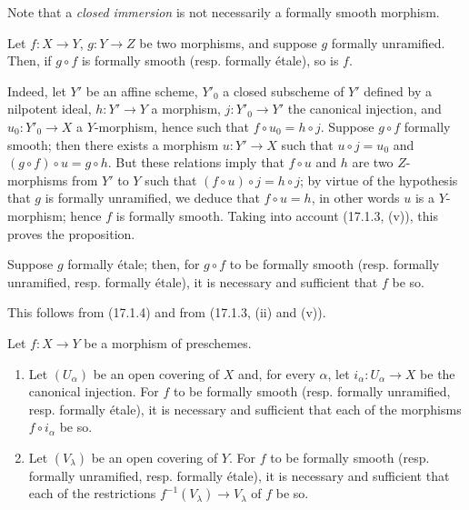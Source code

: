 Note that a \emph{closed immersion} is not necessarily a formally smooth morphism.

\begin{proposition}[17.1.4]
\label{IV.17.1.4}
Let $f:X\to Y$, $g:Y\to Z$ be two morphisms, and suppose $g$ formally unramified. Then, if $g\circ f$ is formally smooth (resp. formally étale), so is $f$.
\end{proposition}

Indeed, let $Y'$ be an affine scheme, $Y'_0$ a closed subscheme of $Y'$ defined by a nilpotent ideal, $h:Y'\to Y$ a morphism, $j:Y'_0\to Y'$ the canonical injection, and $u_0:Y'_0\to X$ a $Y$-morphism, hence such that $f\circ u_0=h\circ j$. Suppose $g\circ f$ formally smooth; then there exists a morphism $u:Y'\to X$ such that $u\circ j=u_0$ and $(g\circ f)\circ u=g\circ h$. But these relations imply that $f\circ u$ and $h$ are two $Z$-morphisms from $Y'$ to $Y$ such that $(f\circ u)\circ j=h\circ j$; by virtue of the hypothesis that $g$ is formally unramified, we deduce that $f\circ u=h$, in other words $u$ is a $Y$-morphism; hence $f$ is formally smooth. Taking into account (17.1.3, (v)), this proves the proposition.

\begin{corollary}[17.1.5]
\label{IV.17.1.5}
Suppose $g$ formally étale; then, for $g\circ f$ to be formally smooth (resp. formally unramified, resp. formally étale), it is necessary and sufficient that $f$ be so.
\end{corollary}

This follows from (17.1.4) and from (17.1.3, (ii) and (v)).

\begin{proposition}[17.1.6]
\label{IV.17.1.6}
Let $f:X\to Y$ be a morphism of preschemes.
\begin{enumerate}
  \item[(i)] Let $(U_\alpha)$ be an open covering of $X$ and, for every $\alpha$, let $i_\alpha:U_\alpha\to X$ be the canonical injection. For $f$ to be formally smooth (resp. formally unramified, resp. formally étale), it is necessary and sufficient that each of the morphisms $f\circ i_\alpha$ be so.
  \item[(ii)] Let $(V_\lambda)$ be an open covering of $Y$. For $f$ to be formally smooth (resp. formally unramified, resp. formally étale), it is necessary and sufficient that each of the restrictions $f^{-1}(V_\lambda)\to V_\lambda$ of $f$ be so.
\end{enumerate}
\end{proposition}

